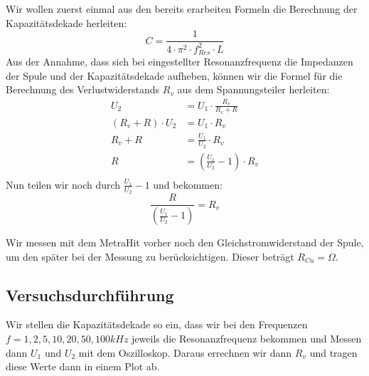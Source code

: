 \documentclass{article}
\begin{document}
Wir wollen zuerst einmal aus den bereits erarbeiten Formeln die Berechnung der Kapazitätsdekade herleiten:
\begin{equation}
  C = \frac{1}{4\cdot\pi^2\cdot f_{Res}^2 \cdot L}
\end{equation}
Aus der Annahme, dass sich bei eingestellter Resonanzfrequenz die Impedanzen der Spule und der Kapazitätsdekade aufheben, können wir die Formel
für die Berechnung des Verlustwiderstands $R_v$ aus dem Spannungsteiler herleiten:
\begin{align*}
  U_2                           & = U_1 \cdot \frac{R_v}{R_v+R}                \\
  \left(R_v + R\right)\cdot U_2 & = U_1 \cdot R_v                              \\
  R_v + R                       & = \frac{U_1}{U_2} \cdot R_v                  \\
  R                             & = \left(\frac{U_1}{U_2} - 1\right) \cdot R_v \\
\end{align*}
Nun teilen wir noch durch $\frac{U_1}{U_2} - 1$ und bekommen:
\begin{equation}
  \frac{R}{\left(\frac{U_1}{U_2} - 1\right)}  = R_v
\end{equation}

Wir messen mit dem MetraHit vorher noch den Gleichstromwiderstand der Spule, um den später bei der Messung zu berücksichtigen.
Dieser beträgt $R_{Cu} = \Omega$.

\subsection{Versuchsdurchführung}

Wir stellen die Kapazitätsdekade so ein, dass wir bei den Frequenzen $f = 1,2,5,10,20,50,100kHz$ jeweils die Resonanzfrequenz bekommen und Messen dann
$U_1$ und $U_2$ mit dem Oszilloskop. Daraus errechnen wir dann $R_v$ und tragen diese Werte dann in einem Plot ab.
\end{document}
